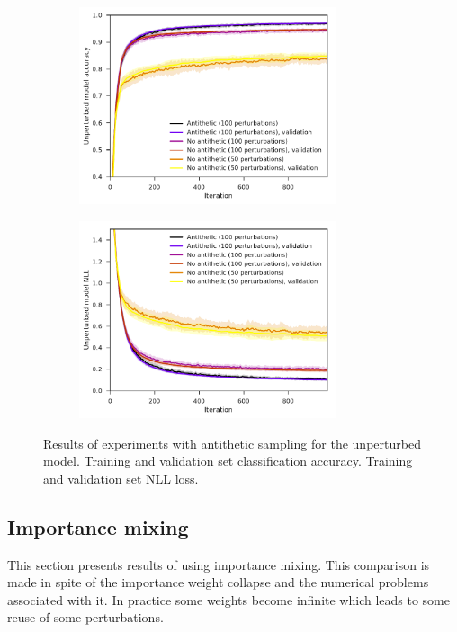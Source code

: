 \begin{figure}[tbp!]
    \begin{subfigure}[b]{0.49\textwidth}
        \centering
        \includegraphics[height=5.8cm]{graphics/E022-AS-analysis/accuracy_unp-all-series-mean-sd.pdf}
        \caption{}
        \label{fig: Theory: E022-AS-analysis/accuracy_unp-all-series-mean-sd}
    \end{subfigure}
    \hfill
    \begin{subfigure}[b]{0.49\textwidth}
        \centering
        \includegraphics[height=5.8cm]{graphics/E022-AS-analysis/return_unp-all-series-mean-sd.pdf}
        \caption{}
        \label{fig: Theory: E022-AS-analysis/return_unp-all-series-mean-sd}
    \end{subfigure}
    \caption{
        Results of experiments with antithetic sampling for the unperturbed model.
         Training and validation set classification accuracy.
         Training and validation set \gls{NLL} loss.
    }
    \label{fig: Theory: E022-AS-analysis}
\end{figure}

\subsection{Importance mixing}
This section presents results of using importance mixing. This comparison is made in spite of the importance weight collapse and the numerical problems associated with it. In practice some weights become infinite which leads to some reuse of some perturbations. 

